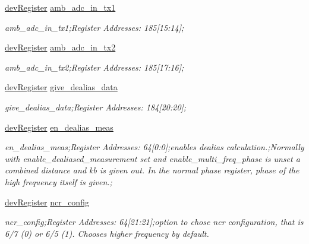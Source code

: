 \begin{DoxyCompactItemize}
\mbox{\hyperlink{classdev_register}{dev\+Register}} \mbox{\hyperlink{class_o_p_t3101_registers_aa0cd98341be161b1f631944818072316}{amb\+\_\+adc\+\_\+in\+\_\+tx1}}
\begin{DoxyCompactList}\small\item\em amb\+\_\+adc\+\_\+in\+\_\+tx1;Register Addresses\+: 185\mbox{[}15\+:14\mbox{]}; \end{DoxyCompactList}\item 
\mbox{\hyperlink{classdev_register}{dev\+Register}} \mbox{\hyperlink{class_o_p_t3101_registers_ad884a0663807d2299774a46487cb40ee}{amb\+\_\+adc\+\_\+in\+\_\+tx2}}
\begin{DoxyCompactList}\small\item\em amb\+\_\+adc\+\_\+in\+\_\+tx2;Register Addresses\+: 185\mbox{[}17\+:16\mbox{]}; \end{DoxyCompactList}\item 
\mbox{\hyperlink{classdev_register}{dev\+Register}} \mbox{\hyperlink{class_o_p_t3101_registers_a07d7e20955cbd473bd6eba64f532f1c5}{give\+\_\+dealias\+\_\+data}}
\begin{DoxyCompactList}\small\item\em give\+\_\+dealias\+\_\+data;Register Addresses\+: 184\mbox{[}20\+:20\mbox{]}; \end{DoxyCompactList}\item 
\mbox{\hyperlink{classdev_register}{dev\+Register}} \mbox{\hyperlink{class_o_p_t3101_registers_a232da339cdb131b831fdff595d85270c}{en\+\_\+dealias\+\_\+meas}}
\begin{DoxyCompactList}\small\item\em en\+\_\+dealias\+\_\+meas;Register Addresses\+: 64\mbox{[}0\+:0\mbox{]};enables dealias calculation.;Normally with enable\+\_\+dealiased\+\_\+measurement set and enable\+\_\+multi\+\_\+freq\+\_\+phase is unset a combined distance and kb is given out. In the normal phase register, phase of the high frequency itself is given.; \end{DoxyCompactList}\item 
\mbox{\hyperlink{classdev_register}{dev\+Register}} \mbox{\hyperlink{class_o_p_t3101_registers_a161695952966e854642175f92bbd3ae6}{ncr\+\_\+config}}
\begin{DoxyCompactList}\small\item\em ncr\+\_\+config;Register Addresses\+: 64\mbox{[}21\+:21\mbox{]};option to chose ncr configuration, that is 6/7 (0) or 6/5 (1). Chooses higher frequency by default. \end{DoxyCompactList}\item 

\end{DoxyCompactItemize}
